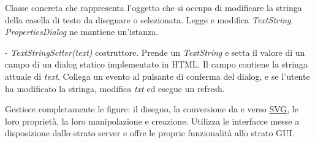 Classe concreta che rappresenta l'oggetto che si occupa di modificare la stringa della casella di testo da disegnare o selezionata.
Legge e modifica \textit{TextString}.
\textit{PropertiesDialog} ne mantiene un'istanza.
\begin{elencopuntato}[\subsubsecindent]
\item[-] \textit{TextStringSetter(text)} costruttore. Prende un \textit{TextString} e setta il valore di un campo di un dialog statico implementato in HTML. Il campo contiene la stringa attuale di \textit{text}. Collega un evento al pulsante di conferma del dialog, e se l'utente ha modificato la stringa, modifica \textit{txt} ed esegue un refresh.
\end{elencopuntato}


Gestisce completamente le figure: il disegno, la conversione da e verso \underline{SVG}, le loro propriet\`a, la loro manipolazione e creazione. Utilizza le interfacce messe a disposizione dallo strato server e offre le proprie funzionalit\`a allo strato GUI.

